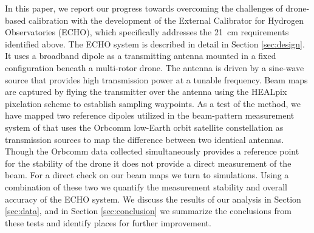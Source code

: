 \documentclass[preprint2,numberedappendix,tighten,twocolappendix]{aastex6}
\begin{document}
In this paper, we report our progress towards overcoming the challenges of drone-based calibration with the development of the External Calibrator for Hydrogen Observatories (ECHO), which specifically addresses the 21~cm requirements identified above.  The ECHO system is described in detail in Section \ref{sec:design}.  It uses a broadband dipole as a transmitting antenna mounted in a fixed configuration beneath a multi-rotor drone. The antenna is driven by a sine-wave source that provides high transmission power at a tunable frequency. Beam maps are captured by flying the transmitter over the antenna using the HEALpix pixelation scheme to establish sampling waypoints.  As a test of the method, we have mapped two reference dipoles utilized in the beam-pattern measurement system of \citet{2016:NebenHERAdish} that uses the Orbcomm low-Earth orbit satellite constellation as transmission sources to map the difference between two identical antennas.  Though the Orbcomm data collected simultaneously provides a reference point for the stability of the drone it does not provide a direct measurement of the beam. For a direct check on our beam maps we turn to simulations. Using a combination of these two we quantify the measurement stability and overall accuracy of the ECHO system.  We discuss the results of our analysis in Section \ref{sec:data}, and in Section \ref{sec:conclusion} we summarize the conclusions from these tests and identify places for further improvement.
\end{document}
